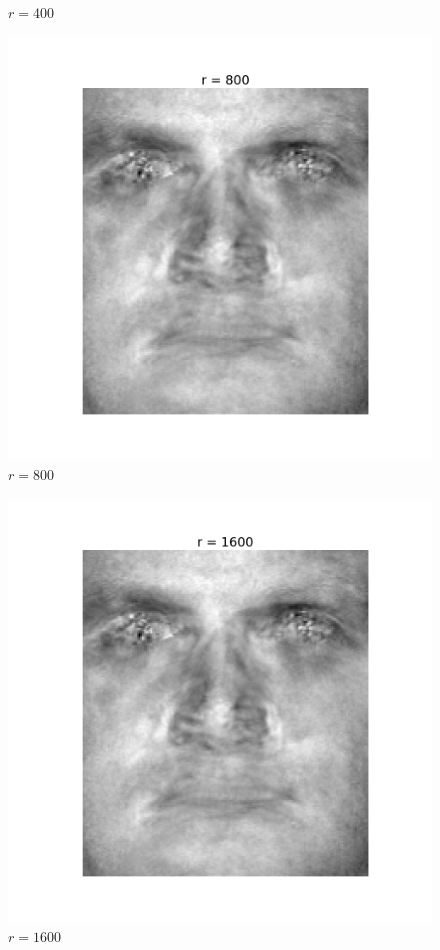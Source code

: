\begin{enumerate}[label=\arabic*.]
\begin{mdframed}[style=MyFrame]
\begin{figure}[H]
                    \caption{$r=400$}
                \end{figure}
                \begin{figure}[H]
                    \includegraphics[height=0.35\textheight]{../media/r-800-2.png}
                    \caption{$r=800$}
                \end{figure}
                \begin{figure}[H]
                    \includegraphics[height=0.35\textheight]{../media/r-1600-2.png}
                    \caption{$r=1600$}
                \end{figure}
            \end{mdframed}
\end{enumerate}
